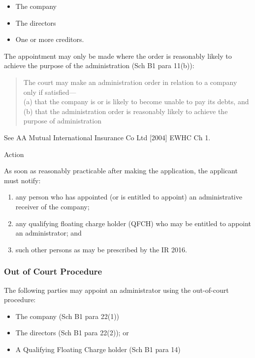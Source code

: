 \documentclass[
]{article}
\providecommand{\tightlist}{%
  \setlength{\itemsep}{0pt}\setlength{\parskip}{0pt}}
\newenvironment{env-862347ee-a221-4f52-a3b4-3eedf85d51d9}
{
    \savenotes\tcolorbox[blanker,breakable,left=5pt,borderline west={2pt}{-4pt}{aquamarine}]
}
{
    \endtcolorbox\spewnotes
}
\begin{document}
\begin{itemize}
\tightlist
\item
  The company
\item
  The directors
\item
  One or more creditors.
\end{itemize}

The appointment may only be made where the order is reasonably likely to
achieve the purpose of the administration (Sch B1 para 11(b)):

\begin{quote}
The court may make an administration order in relation to a company only
if satisfied---\\
(a) that the company is or is likely to become unable to pay its debts,
and\\
(b) that the administration order is reasonably likely to achieve the
purpose of administration
\end{quote}

See AA Mutual International Insurance Co Ltd {[}2004{]} EWHC Ch 1.

\begin{env-862347ee-a221-4f52-a3b4-3eedf85d51d9}

Action

As soon as reasonably practicable after making the application, the
applicant must notify:

\begin{enumerate}
\tightlist
\item
  any person who has appointed (or is entitled to appoint) an
  administrative receiver of the company;
\item
  any qualifying floating charge holder (QFCH) who may be entitled to
  appoint an administrator; and
\item
  such other persons as may be prescribed by the IR 2016.
\end{enumerate}

\end{env-862347ee-a221-4f52-a3b4-3eedf85d51d9}

\hypertarget{out-of-court-procedure}{%
\subsubsection{Out of Court Procedure}\label{out-of-court-procedure}}

The following parties may appoint an administrator using the
out-of-court procedure:

\begin{itemize}
\tightlist
\item
  The company (Sch B1 para 22(1))
\item
  The directors (Sch B1 para 22(2)); or
\item
  A Qualifying Floating Charge holder (Sch B1 para 14)
\end{itemize}
\end{document}
